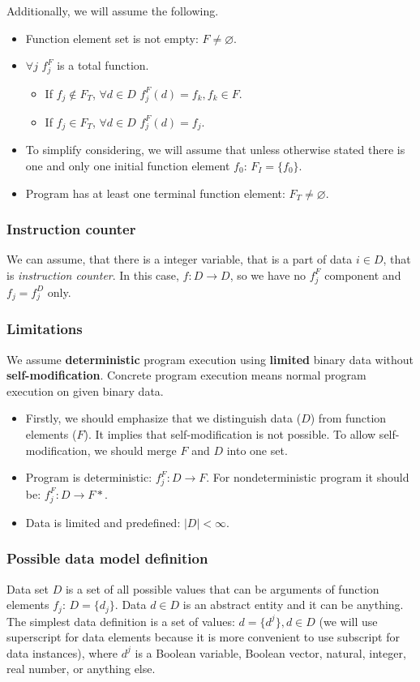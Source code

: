 \documentclass[oneside,a4]{article}  %
\newcommand{\subsublevel}{\subsubsection}
\newcommand{\ra}{\rightarrow}
\newcommand{\term}[1]{\textit{#1}\index{#1}}
\begin{document}
Additionally, we will assume the following.
\begin{itemize}
    \item Function element set is not empty: $F \neq \varnothing$.
    \item $\forall j \,\, f^F_j$ is a total function.
    \begin{itemize}
        \item If $f_j \notin F_T$,
            $\forall d \in D \,\, f^F_j(d) = f_k, f_k \in F$.
        \item If $f_j \in F_T$,
            $\forall d \in D \,\, f^F_j(d) = f_j$.
    \end{itemize}
    \item To simplify considering, we will assume that unless otherwise stated
        there is one and only one initial function element $f_0$:
        $F_I = \{f_0\}$.
    \item Program has at least one terminal function element:
        $F_T \neq \varnothing$.
\end{itemize}

\subsublevel*{Instruction counter}

We can assume, that there is a integer variable, that is a part of data
$i \in D$, that is \term{instruction counter}.
In this case, $f: D \ra D$, so
we have no $f_j^F$ component and $f_j = f^D_j$ only.

\subsublevel*{Limitations}

We assume \textbf{deterministic} program execution
using \textbf{limited} binary data without \textbf{self-modification}.
Concrete program execution means normal program execution on given binary data.

\begin{itemize}
    \item Firstly, we should emphasize that we distinguish data ($D$)
        from function elements ($F$).
        It implies that self-modification is not possible.
        To allow self-modification, we should merge $F$ and $D$ into one set.
    \item Program is deterministic: $f^F_j: D \ra F$.
        For nondeterministic program it should be: $f^F_j: D \ra F*$.
    \item Data is limited and predefined: $|D| < \infty$.
\end{itemize}

\subsublevel*{Possible data model definition}

Data set $D$ is a set of all possible values that can be arguments of
function elements $f_j$: $D = \{d_j\}$.
Data $d \in D$ is an abstract entity and it can be anything.
The simplest data definition is a set of values: $d = \{d^j\}, d \in D$
(we will use superscript for data elements because it is more convenient to use
subscript for data instances), where $d^j$ is a Boolean variable,
Boolean vector, natural, integer, real number, or anything else.
\end{document}
